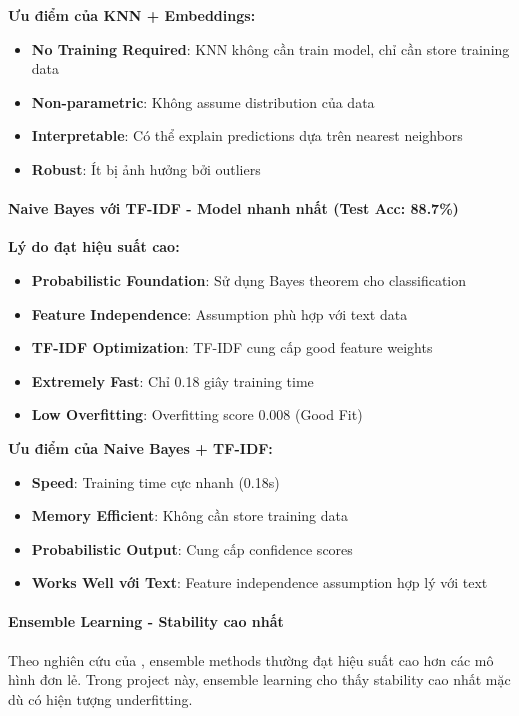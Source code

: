 \textbf{Ưu điểm của KNN + Embeddings:}
\begin{itemize}
    \item \textbf{No Training Required}: KNN không cần train model, chỉ cần store training data
    \item \textbf{Non-parametric}: Không assume distribution của data
    \item \textbf{Interpretable}: Có thể explain predictions dựa trên nearest neighbors
    \item \textbf{Robust}: Ít bị ảnh hưởng bởi outliers
\end{itemize}

\paragraph{Naive Bayes với TF-IDF - Model nhanh nhất (Test Acc: 88.7\%)}

\textbf{Lý do đạt hiệu suất cao:}
\begin{itemize}
    \item \textbf{Probabilistic Foundation}: Sử dụng Bayes theorem cho classification
    \item \textbf{Feature Independence}: Assumption phù hợp với text data
    \item \textbf{TF-IDF Optimization}: TF-IDF cung cấp good feature weights
    \item \textbf{Extremely Fast}: Chỉ 0.18 giây training time
    \item \textbf{Low Overfitting}: Overfitting score 0.008 (Good Fit)
\end{itemize}

\textbf{Ưu điểm của Naive Bayes + TF-IDF:}
\begin{itemize}
    \item \textbf{Speed}: Training time cực nhanh (0.18s)
    \item \textbf{Memory Efficient}: Không cần store training data
    \item \textbf{Probabilistic Output}: Cung cấp confidence scores
    \item \textbf{Works Well với Text}: Feature independence assumption hợp lý với text
\end{itemize}

\paragraph{Ensemble Learning - Stability cao nhất}

Theo nghiên cứu của \cite{maclin2011}, ensemble methods thường đạt hiệu suất cao hơn các mô hình đơn lẻ. Trong project này, ensemble learning cho thấy stability cao nhất mặc dù có hiện tượng underfitting.

